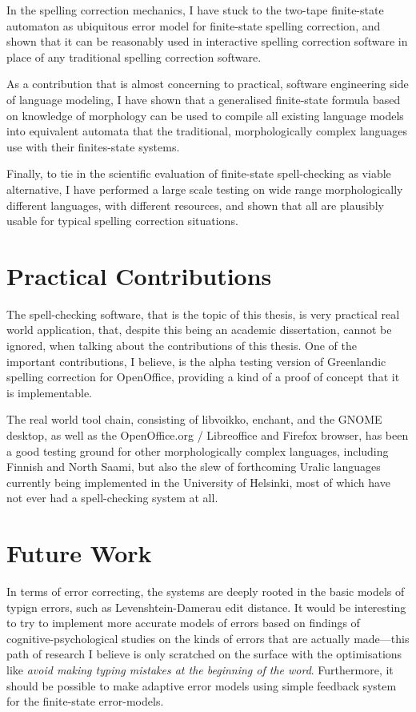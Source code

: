 \documentclass[officiallayout]{unihelcompling}
\begin{document}
In the spelling correction mechanics, I have stuck to the two-tape finite-state
automaton as ubiquitous error model for finite-state spelling correction, and
shown that it can be reasonably used in interactive spelling correction
software in place of any traditional spelling correction software.

As a contribution that is almost concerning to practical, software engineering
side of language modeling, I have shown that a generalised finite-state formula
based on knowledge of morphology can be used to compile all existing language
models into equivalent automata that the traditional, morphologically complex
languages use with their finites-state systems.

Finally, to tie in the scientific evaluation of finite-state spell-checking as
viable alternative, I have performed a large scale testing on wide range
morphologically different languages, with different resources, and shown that
all are plausibly usable for typical spelling correction situations.


\section{Practical Contributions}
\label{sec:practical-contributions}

The spell-checking software, that is the topic of this thesis, is very
practical real world application, that, despite this being an academic
dissertation, cannot be ignored, when talking about the contributions of this
thesis. One of the important contributions, I believe, is the alpha testing
version of Greenlandic spelling correction for OpenOffice, providing a kind of
a proof of concept that it is implementable.

The real world tool chain, consisting of libvoikko, enchant, and the GNOME
desktop, as well as the OpenOffice.org / Libreoffice and Firefox browser, has
been a good testing ground for other morphologically complex languages,
including Finnish and North Saami, but also the slew of forthcoming Uralic
languages currently being implemented in the University of Helsinki, most of
which have not ever had a spell-checking system at all. 

\section{Future Work}
\label{sec:future-work}

In terms of error correcting, the systems are deeply rooted in the basic models
of typign errors, such as Levenshtein-Damerau edit distance. It would be
interesting to try to implement more accurate models of errors based on
findings of cognitive-psychological studies on the kinds of errors that are
actually made---this path of research I believe is only scratched on the
surface with the optimisations like \emph{avoid making typing mistakes at the
beginning of the word}. Furthermore, it should be possible to make adaptive
error models using simple feedback system for the finite-state error-models.
\end{document}
